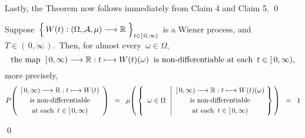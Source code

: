 \vskip 0.5cm
\noindent
Lastly, the Theorem now follows immediately from Claim 4 and Claim 5.
\qed


\vskip 1.0cm
\begin{theorem}
\label{WienerProcessHasNowhereDifferentiableSamplePaths}
\mbox{}
\vskip 0.2cm
\noindent
Suppose
\,$\left\{\,\overset{{\color{white}.}}{W}(t) : (\Omega,\mathcal{A},\mu) \longrightarrow \Re \;\right\}_{t \in[\,0,\infty)}$\,
is a Wiener process,
and \,$T \in (\,0,\infty\,)$.\,
Then, for almost every \,$\omega \in \Omega$,
\begin{equation*}
\textnormal{the map}\;\;
[\,0,\infty) \longrightarrow \Re : t \longmapsto W(t)(\omega)
\;\;\textnormal{is non-differentiable at each \,$t \in [\,0,\infty)$},
\end{equation*}
more precisely,
\begin{equation*}
P\!\left(
	\begin{array}{c}
	[\,0,\infty) \longrightarrow \Re : t \longmapsto W(t)
	\\
	\overset{{\color{white}.}}{\textnormal{is non-differentiable}}
	\\
	\overset{{\color{white}.}}{\textnormal{at each \,$t \in [\,0,\infty)$}}
	\end{array}
	\right)
\;\; = \;\;
	\mu\!\left(\,\left\{\;\;
		\omega \in \Omega
		\,\;\left\vert
		\begin{array}{c}
			[\,0,\infty) \longrightarrow \Re : t \longmapsto W(t)(\omega)
			\\
			\overset{{\color{white}.}}{\textnormal{is non-differentiable}}
			\\
			\overset{{\color{white}.}}{\textnormal{at each \,$t \in [\,0,\infty)$}}
			\end{array}
			\right.
		\!\!\right\}\,\right)
\;\; = \;\;
	1
\end{equation*}
\end{theorem}
\proof

\qed

